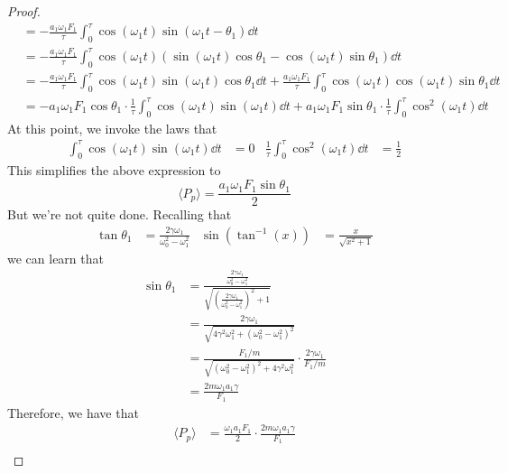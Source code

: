 \documentclass[../psets.tex]{subfiles}
\begin{document}
\begin{enumerate}
\begin{enumerate}
\begin{proof}
\begin{align*}
                &= -\frac{a_1\omega_1F_1}{\tau}\int_0^\tau\cos(\omega_1t)\sin(\omega_1t-\theta_1)\dd{t}\\
                &= -\frac{a_1\omega_1F_1}{\tau}\int_0^\tau\cos(\omega_1t)(\sin(\omega_1t)\cos\theta_1-\cos(\omega_1t)\sin\theta_1)\dd{t}\\
                &= -\frac{a_1\omega_1F_1}{\tau}\int_0^\tau\cos(\omega_1t)\sin(\omega_1t)\cos\theta_1\dd{t}+\frac{a_1\omega_1F_1}{\tau}\int_0^\tau\cos(\omega_1t)\cos(\omega_1t)\sin\theta_1\dd{t}\\
                &= -a_1\omega_1F_1\cos\theta_1\cdot\frac{1}{\tau}\int_0^\tau\cos(\omega_1t)\sin(\omega_1t)\dd{t}+a_1\omega_1F_1\sin\theta_1\cdot\frac{1}{\tau}\int_0^\tau\cos^2(\omega_1t)\dd{t}
            \end{align*}
            \endgroup
            At this point, we invoke the laws that
            \begin{align*}
                \int_0^\tau\cos(\omega_1t)\sin(\omega_1t)\dd{t} &= 0&
                \frac{1}{\tau}\int_0^\tau\cos^2(\omega_1t)\dd{t} &= \frac{1}{2}
            \end{align*}
            This simplifies the above expression to
            \begin{equation*}
                \langle P_p\rangle = \frac{a_1\omega_1F_1\sin\theta_1}{2}
            \end{equation*}
            But we're not quite done. Recalling that
            \begin{align*}
                \tan\theta_1 &= \frac{2\gamma\omega_1}{\omega_0^2-\omega_1^2}&
                \sin(\tan^{-1}(x)) &= \frac{x}{\sqrt{x^2+1}}
            \end{align*}
            we can learn that
            \begin{align*}
                \sin\theta_1 &= \frac{\frac{2\gamma\omega_1}{\omega_0^2-\omega_1^2}}{\sqrt{\left( \frac{2\gamma\omega_1}{\omega_0^2-\omega_1^2} \right)^2+1}}\\
                &= \frac{2\gamma\omega_1}{\sqrt{4\gamma^2\omega_1^2+(\omega_0^2-\omega_1^2)^2}}\\
                &= \frac{F_1/m}{\sqrt{(\omega_0^2-\omega_1^2)^2+4\gamma^2\omega_1^2}}\cdot\frac{2\gamma\omega_1}{F_1/m}\\
                &= \frac{2m\omega_1a_1\gamma}{F_1}
            \end{align*}
            Therefore, we have that
            \begin{align*}
                \langle P_p\rangle &= \frac{\omega_1a_1F_1}{2}\cdot\frac{2m\omega_1a_1\gamma}{F_1}\\

\end{align*}
\end{proof}
\end{enumerate}
\end{enumerate}
\end{document}
